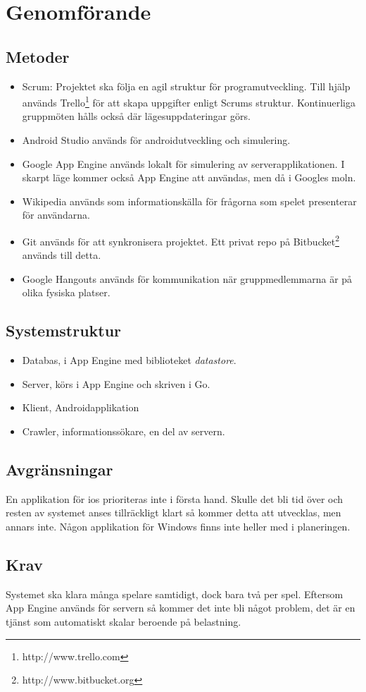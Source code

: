 \documentclass[swedish,12pt,a4paper]{article}
\begin{document}
\section{Genomförande}
\subsection{Metoder}
\begin{itemize}
\item Scrum: Projektet ska följa en agil struktur för programutveckling. Till hjälp används Trello\footnote{http://www.trello.com} för att skapa uppgifter enligt Scrums struktur. Kontinuerliga gruppmöten hålls också där lägesuppdateringar görs.
\item Android Studio används för androidutveckling och simulering.
\item Google App Engine används lokalt för simulering av serverapplikationen. I skarpt läge kommer också App Engine att användas, men då i Googles moln.
\item Wikipedia används som informationskälla för frågorna som spelet presenterar för användarna.
\item Git används för att synkronisera projektet. Ett privat repo på Bitbucket\footnote{http://www.bitbucket.org} används till detta.
\item Google Hangouts används för kommunikation när gruppmedlemmarna är på olika fysiska platser.
\end{itemize}
\subsection{Systemstruktur}
\begin{itemize}
\item Databas, i App Engine med biblioteket \textit{datastore}.
\item Server, körs i App Engine och skriven i Go.
\item Klient, Androidapplikation
\item Crawler, informationssökare, en del av servern.
\end{itemize}
\subsection{Avgränsningar}
En applikation för ios prioriteras inte i första hand. Skulle det bli tid över och resten av systemet anses tillräckligt klart så kommer detta att utvecklas, men annars inte. Någon applikation för Windows finns inte heller med i planeringen.
\subsection{Krav}
Systemet ska klara många spelare samtidigt, dock bara två per spel. Eftersom App Engine används för servern så kommer det inte bli något problem, det är en tjänst som automatiskt skalar beroende på belastning.
\end{document}
